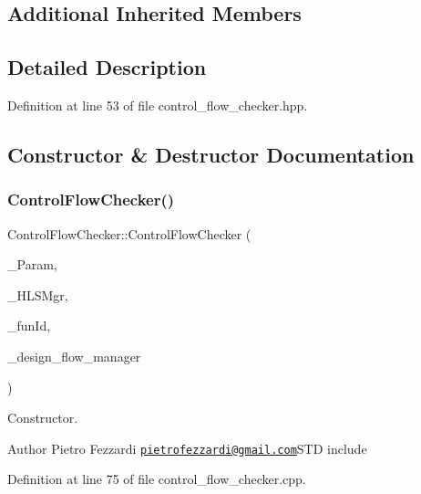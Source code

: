 \subsection*{Additional Inherited Members}


\subsection{Detailed Description}


Definition at line 53 of file control\+\_\+flow\+\_\+checker.\+hpp.



\subsection{Constructor \& Destructor Documentation}
\mbox{\label{classControlFlowChecker_a8c9d01857ece3fcfbd56bac8bd9abb44}} 
\subsubsection{\texorpdfstring{Control\+Flow\+Checker()}{ControlFlowChecker()}}
{\footnotesize\ttfamily Control\+Flow\+Checker\+::\+Control\+Flow\+Checker (\begin{DoxyParamCaption}\item[{const \hyperlink{Parameter_8hpp_a37841774a6fcb479b597fdf8955eb4ea}{Parameter\+Const\+Ref}}]{\+\_\+\+Param,  }\item[{const \hyperlink{hls__manager_8hpp_acd3842b8589fe52c08fc0b2fcc813bfe}{H\+L\+S\+\_\+manager\+Ref}}]{\+\_\+\+H\+L\+S\+Mgr,  }\item[{unsigned int}]{\+\_\+fun\+Id,  }\item[{const Design\+Flow\+Manager\+Const\+Ref}]{\+\_\+design\+\_\+flow\+\_\+manager }\end{DoxyParamCaption})}



Constructor. 

\begin{DoxyAuthor}{Author}
Pietro Fezzardi \href{mailto:pietrofezzardi@gmail.com}{\tt pietrofezzardi@gmail.\+com}S\+TD include 
\end{DoxyAuthor}


Definition at line 75 of file control\+\_\+flow\+\_\+checker.\+cpp.



